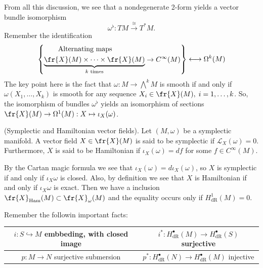 From all this discussion, we see that a nondegenerate 2-form yields a vector bundle isomorphism
\begin{equation}
    \omega^\flat : TM\overset{\cong}{\rightarrow} T^*M.
\end{equation}
Remember the identification
\begin{equation}
    \left\{
        \begin{aligned}
            &\quad\quad\text{Alternating maps}\\
            &\underset{k\text{ times}}{\underbrace{\fr{X}(M)\times\cdots\times \fr{X}(M)}}\to C^\infty(M)
        \end{aligned}
    \right\}\longleftrightarrow
    \Omega^k(M)
\end{equation}
The key point here is the fact that $\omega:M\to \bigwedge^k M$ is smooth if and only if $\omega(X_1,\dots, X_k)$ 
is smooth for any sequence $X_i\in\fr{X}(M),\;i=1,\dots, k$. So, the isomorphism of bundles $\omega^\flat$ yields an isomorphism of sections 
$\fr{X}(M)\to \Omega^1(M):X\mapsto \iota_X(\omega)$. 

\begin{dang}
    \begin{definition}
        (Symplectic and Hamiltonian vector fields).
        Let $(M,\omega)$ be a symplectic manifold.
        A vector field $X\in\fr{X}(M)$ is said to be symplectic if $\mathcal{L}_X(\omega)=0$. Furthermore, $X$ is said 
        to be Hamiltonian if $\iota_X(\omega)=df$ for some $f\in C^\infty(M)$.
    \end{definition}
\end{dang}

By the Cartan magic formula we see that $\iota_X(\omega)=d\iota_X(\omega)$, so $X$ is symplectic if and only if 
$\iota_X\omega$ is closed. Also, by definition we see that $X$ is Hamiltonian if and only if $\iota_X\omega$ is exact.
Then we have a inclusion $\fr{X}_{\text{Ham}}(M)\subset\fr{X}_{\omega}(M)$ and the equality occurs only if 
$H_{\text{dR}}^1(M)=0$.

Remember the followin important facts:
\begin{center}
    \begin{tabular}{|c|c|}
        \hline 
        $i:S\hookrightarrow M$ embbeding, with closed image 
        & $i^*:H_{\text{dR}}^\bullet(M)\to H_{\text{dR}}^\bullet(S)$ surjective\\
        \hline
        $p:M\to N$ surjective submersion
        & $p^*:H_{\text{dR}}^\bullet(N)\to H_{\text{dR}}^\bullet(M)$ injective\\
        \hline
    \end{tabular}
\end{center}


